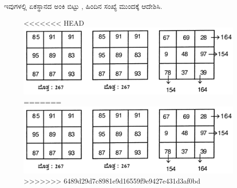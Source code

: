 ಇವುಗಳಲ್ಲಿ ಏಕಸ್ಥಾನದ ಅಂಕಿ ಬಿಟ್ಟು , ಹಿಂದಿನ ಸಂಖ್ಯೆ ಮುಂದಕ್ಕೆ ಆದೇಶಿಸಿ.
\begin{figure}[H]
<<<<<<< HEAD
\includegraphics{src/figures/chap7/fig7-14.jpg}
=======
\includegraphics[scale=0.85]{src/figures/chap7/fig7.14.jpg}
>>>>>>> 6489d29d7c8981e9d16559f9e9427e431d3af0bd
\end{figure}

